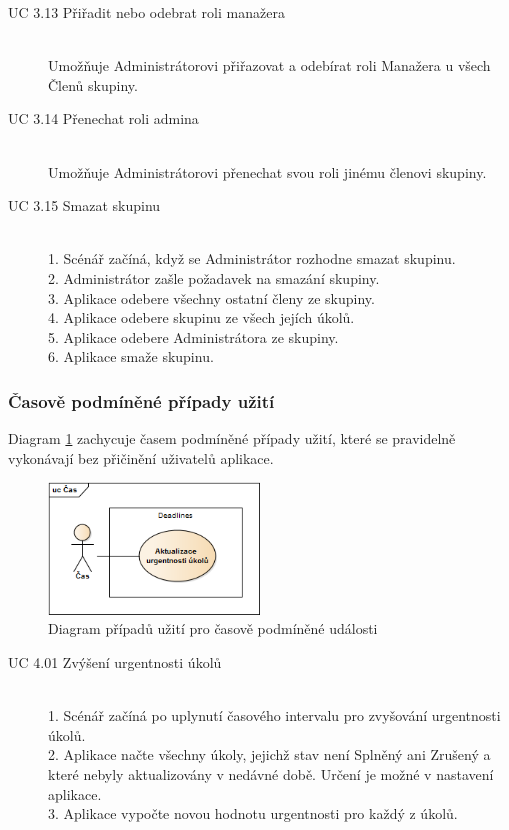 \documentclass[thesis=B,czech]{FITthesis}[2012/06/26]
\begin{document}
\begin{description}
				\item[UC 3.13 Přiřadit nebo odebrat roli manažera] \hfill \\
					Umožňuje Administrátorovi přiřazovat a odebírat roli Manažera u všech Členů skupiny.
					
				\item[UC 3.14 Přenechat roli admina] \hfill \\
					Umožňuje Administrátorovi přenechat svou roli jinému členovi skupiny.
					
				\item[UC 3.15 Smazat skupinu] \hfill \\
					1. Scénář začíná, když se Administrátor rozhodne smazat skupinu. \\
					2. Administrátor zašle požadavek na smazání skupiny. \\
					3. Aplikace odebere všechny ostatní členy ze skupiny. \\
					4. Aplikace odebere skupinu ze všech jejích úkolů. \\
					5. Aplikace odebere Administrátora ze skupiny. \\
					6. Aplikace smaže skupinu. \\
					
			\end{description}

			
			
			\subsubsection{Časově podmíněné případy užití}
			Diagram \ref{diagram:uc-time} zachycuje časem podmíněné případy užití, které se pravidelně vykonávají bez přičinění uživatelů aplikace.
			\begin{figure}\centering
				\includegraphics[width=0.5\textwidth]{ea-diagrams/uc-time.png}
				\caption[Případy užití časových událostí]{Diagram případů užití pro časově podmíněné události}
				\label{diagram:uc-time}
			\end{figure}
			
			\begin{description}
				\item[UC 4.01 Zvýšení urgentnosti úkolů] \hfill \\
					1. Scénář začíná po uplynutí časového intervalu pro zvyšování urgentnosti úkolů. \\
					2. Aplikace načte všechny úkoly, jejichž stav není Splněný ani Zrušený a které nebyly aktualizovány v nedávné době. Určení  je možné v nastavení aplikace. \\
					3. Aplikace vypočte novou hodnotu urgentnosti pro každý z úkolů. \\
			\end{description}
			
\end{document}
